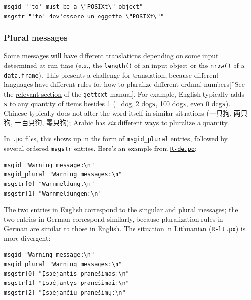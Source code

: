 \documentclass[
]{book}
\begin{document}
\begin{verbatim}
msgid "'to' must be a \"POSIXt\" object"
msgstr "'to' dev'essere un oggetto \"POSIXt\""
\end{verbatim}

\hypertarget{plural-messages}{%
\subsubsection{Plural messages}\label{plural-messages}}

Some messages will have different translations depending on some input determined at run time (e.g., the \texttt{length()} of
an input object or the \texttt{nrow()} of a \texttt{data.frame}). This presents a challenge for translation, because different languages
have different rules for how to pluralize different ordinal
numbers{[}\^{}See the \href{https://www.gnu.org/software/gettext/manual/html_node/Plural-forms.html}{relevant section} of the \texttt{gettext} manual{]}.
For example, English typically adds \texttt{s} to any quantity of items besides 1 (1 dog, 2 dog\texttt{s}, 100 dog\texttt{s}, even 0 dog\texttt{s}).
Chinese typically does not alter the word itself in similar situations (一只狗, 两只狗, 一百只狗, 零只狗); Arabic has \emph{six}
different ways to pluralize a quantity.

In \texttt{.po} files, this shows up in the form of \texttt{msgid\_plural} entries, followed by several ordered \texttt{msgstr} entries. Here's an example from
\href{https://github.com/r-devel/r-svn/blob/c715d61cb74b3fee2d035faed9b258e86e420b75/src/library/base/po/R-de.po\#L2015-L2018}{\texttt{R-de.po}}:

\begin{verbatim}
msgid "Warning message:\n"
msgid_plural "Warning messages:\n"
msgstr[0] "Warnmeldung:\n"
msgstr[1] "Warnmeldungen:\n"
\end{verbatim}

The two entries in English correspond to the singular and plural messages; the two entries in German correspond similarly, because
pluralization rules in German are similar to those in English. The situation in Lithuanian
(\href{https://github.com/r-devel/r-svn/blob/c715d61cb74b3fee2d035faed9b258e86e420b75/src/library/base/po/R-lt.po\#L1999-L2003}{\texttt{R-lt.po}})
is more divergent:

\begin{verbatim}
msgid "Warning message:\n"
msgid_plural "Warning messages:\n"
msgstr[0] "Įspėjantis pranešimas:\n"
msgstr[1] "Įspėjantys pranešimai:\n"
msgstr[2] "Įspėjančių pranešimų:\n"
\end{verbatim}
\end{document}

